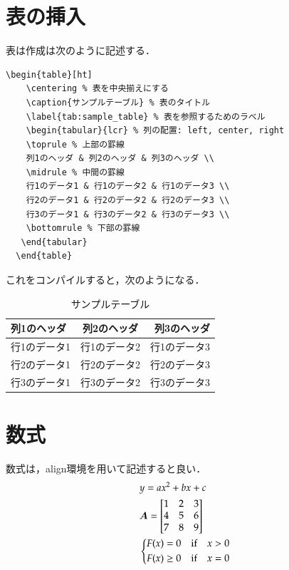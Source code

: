 \documentclass[../main/main]{subfiles}
\begin{document}
\section{表の挿入}
表は作成は次のように記述する．
\lstset{
    frame=single,
    numbers=left,
    tabsize=2
}
\begin{lstlisting}[language={[latex]TeX}]
  \begin{table}[ht]
    \centering % 表を中央揃えにする
    \caption{サンプルテーブル} % 表のタイトル
    \label{tab:sample_table} % 表を参照するためのラベル
    \begin{tabular}{lcr} % 列の配置: left, center, right
    \toprule % 上部の罫線
    列1のヘッダ & 列2のヘッダ & 列3のヘッダ \\
    \midrule % 中間の罫線
    行1のデータ1 & 行1のデータ2 & 行1のデータ3 \\
    行2のデータ1 & 行2のデータ2 & 行2のデータ3 \\
    行3のデータ1 & 行3のデータ2 & 行3のデータ3 \\
    \bottomrule % 下部の罫線
   \end{tabular}
  \end{table}
\end{lstlisting}
これをコンパイルすると，次のようになる．
\begin{table}[ht]
  \centering %
  \caption{サンプルテーブル} %
  \label{tab:sample_table} %
  \begin{tabular}{lcr} %
  \toprule %
  列1のヘッダ & 列2のヘッダ & 列3のヘッダ \\
  \midrule %
  行1のデータ1 & 行1のデータ2 & 行1のデータ3 \\
  行2のデータ1 & 行2のデータ2 & 行2のデータ3 \\
  行3のデータ1 & 行3のデータ2 & 行3のデータ3 \\
  \bottomrule %
 \end{tabular}
\end{table}

\newpage
\section{数式}
数式は，align環境を用いて記述すると良い．
\begin{align}
  &y = a x^{2} + bx + c
  \\
  &\bm{A} = 
  \begin{bmatrix}
    1 & 2 & 3 \\
    4 & 5 & 6 \\
    7 & 8 & 9
  \end{bmatrix}
  \\
  &\begin{dcases}
    F(x) = 0 &\text{if}   \quad x>0
    \\
    F(x) \geq 0 &\text{if} \quad x=0
  \end{dcases}
\end{align}
\end{document}
